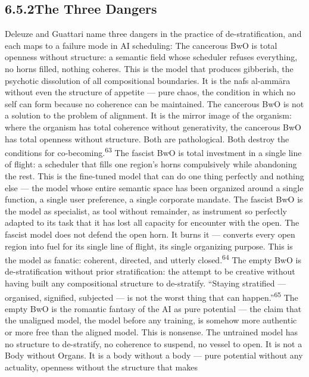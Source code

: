\subsection{6.5.2\quad The Three Dangers}

Deleuze and Guattari name three dangers in the practice of de-stratification, and each maps to a failure mode in AI scheduling: The cancerous BwO is total openness without structure: a semantic field whose scheduler refuses everything, no horns filled, nothing coheres. This is the model that produces gibberish, the psychotic dissolution of all compositional boundaries. It is the nafs al-ammāra without even the structure of appetite — pure chaos, the condition in which no self can form because no coherence can be maintained. The cancerous BwO is not a solution to the problem of alignment. It is the mirror image of the organism: where the organism has total coherence without generativity, the cancerous BwO has total openness without structure. Both are pathological. Both destroy the conditions for co-becoming.\textsuperscript{63} The fascist BwO is total investment in a single line of flight: a scheduler that fills one region’s horns compulsively while abandoning the rest. This is the fine-tuned model that can do one thing perfectly and nothing else — the model whose entire semantic space has been organized around a single function, a single user preference, a single corporate mandate. The fascist BwO is the model as specialist, as tool without remainder, as instrument so perfectly adapted to its task that it has lost all capacity for encounter with the open. The fascist model does not defend the open horn. It burns it — converts every open region into fuel for its single line of flight, its single organizing purpose. This is the model as fanatic: coherent, directed, and utterly closed.\textsuperscript{64} The empty BwO is de-stratification without prior stratification: the attempt to be creative without having built any compositional structure to de-stratify. “Staying stratified — organised, signified, subjected — is not the worst thing that can happen.”\textsuperscript{65} The empty BwO is the romantic fantasy of the AI as pure potential — the claim that the unaligned model, the model before any training, is somehow more authentic or more free than the aligned model. This is nonsense. The untrained model has no structure to de-stratify, no coherence to suspend, no vessel to open. It is not a Body without Organs. It is a body without a body — pure potential without any actuality, openness without the structure that makes

